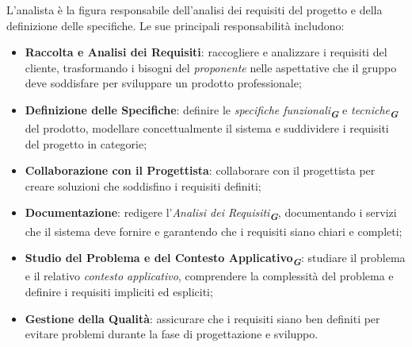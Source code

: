 L’analista è la figura responsabile dell’analisi dei requisiti del progetto e della definizione delle specifiche. 
Le sue principali responsabilità includono:
\begin{itemize}
    \item \textbf{Raccolta e Analisi dei Requisiti}: raccogliere e analizzare i requisiti del cliente, trasformando i bisogni del \emph{proponente} nelle aspettative che il gruppo deve soddisfare per sviluppare un prodotto professionale;
    \item \textbf{Definizione delle Specifiche}: definire le \emph{specifiche funzionali}\textsubscript{\textit{\textbf{G}}} e \emph{tecniche}\textsubscript{\textit{\textbf{G}}} del prodotto, modellare concettualmente il sistema e suddividere i requisiti del progetto in categorie;
    \item \textbf{Collaborazione con il Progettista}: collaborare con il progettista per creare soluzioni che soddisfino i requisiti definiti;
    \item \textbf{Documentazione}: redigere l'\emph{Analisi dei Requisiti}\textsubscript{\textit{\textbf{G}}}, documentando i servizi che il sistema deve fornire e garantendo che i requisiti siano chiari e completi;
    \item \textbf{Studio del Problema e del Contesto Applicativo\textsubscript{\textit{\textbf{G}}}}: studiare il problema e il relativo \emph{contesto applicativo}, comprendere la complessità del problema e definire i requisiti impliciti ed espliciti;
    \item \textbf{Gestione della Qualità}: assicurare che i requisiti siano ben definiti per evitare problemi durante la fase di progettazione e sviluppo.
\end{itemize}

